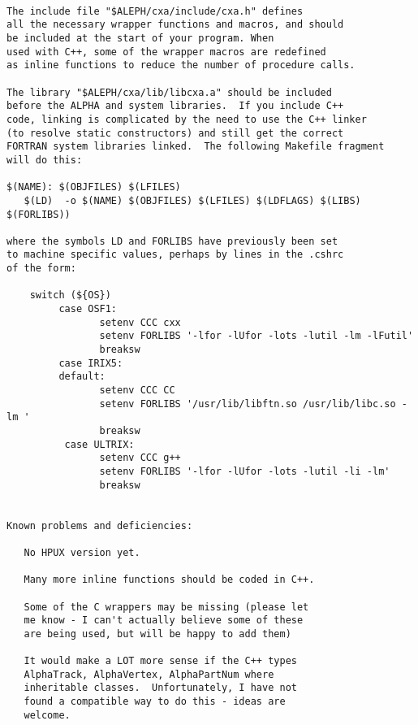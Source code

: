 \begin{verbatim}
 
The include file "$ALEPH/cxa/include/cxa.h" defines
all the necessary wrapper functions and macros, and should
be included at the start of your program. When
used with C++, some of the wrapper macros are redefined
as inline functions to reduce the number of procedure calls.
 
The library "$ALEPH/cxa/lib/libcxa.a" should be included
before the ALPHA and system libraries.  If you include C++
code, linking is complicated by the need to use the C++ linker
(to resolve static constructors) and still get the correct
FORTRAN system libraries linked.  The following Makefile fragment
will do this:
 
$(NAME): $(OBJFILES) $(LFILES)
   $(LD)  -o $(NAME) $(OBJFILES) $(LFILES) $(LDFLAGS) $(LIBS) $(FORLIBS))
 
where the symbols LD and FORLIBS have previously been set
to machine specific values, perhaps by lines in the .cshrc
of the form:
 
    switch (${OS})
         case OSF1:
                setenv CCC cxx
                setenv FORLIBS '-lfor -lUfor -lots -lutil -lm -lFutil'
                breaksw
         case IRIX5:
         default:
                setenv CCC CC
                setenv FORLIBS '/usr/lib/libftn.so /usr/lib/libc.so -lm '
                breaksw
          case ULTRIX:
                setenv CCC g++
                setenv FORLIBS '-lfor -lUfor -lots -lutil -li -lm'
                breaksw
 
 
Known problems and deficiencies:
 
   No HPUX version yet.
 
   Many more inline functions should be coded in C++.
 
   Some of the C wrappers may be missing (please let
   me know - I can't actually believe some of these
   are being used, but will be happy to add them)
 
   It would make a LOT more sense if the C++ types
   AlphaTrack, AlphaVertex, AlphaPartNum where
   inheritable classes.  Unfortunately, I have not
   found a compatible way to do this - ideas are
   welcome.
 
\end{verbatim}
\newpage
